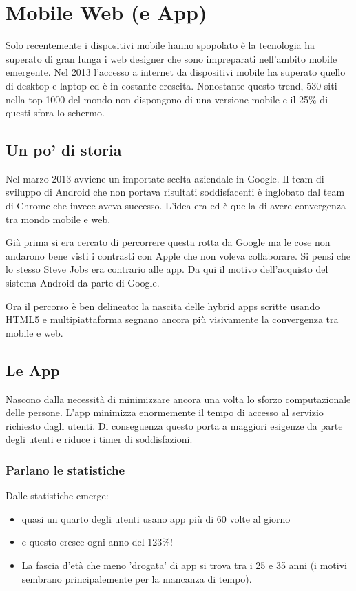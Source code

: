 
\section{Mobile Web (e App)}
	Solo recentemente i dispositivi mobile hanno spopolato è la tecnologia ha superato di gran lunga i web designer che sono impreparati nell'ambito mobile emergente. Nel 2013 l'accesso a internet da dispositivi mobile ha superato quello di desktop e laptop ed è in costante crescita. Nonostante questo trend, 530 siti nella top 1000 del mondo non dispongono di una versione mobile e il 25\% di questi sfora lo schermo.

	\subsection{Un po' di storia}
		Nel marzo 2013 avviene un importate scelta aziendale in Google. Il team di sviluppo di Android che non portava risultati soddisfacenti è inglobato dal team di Chrome che invece aveva successo. L'idea era ed è quella di avere convergenza tra mondo mobile e web. 
		
		Già prima si era cercato di percorrere questa rotta da Google ma le cose non andarono bene visti i contrasti con Apple che non voleva collaborare. Si pensi che lo stesso Steve Jobs era contrario alle app. Da qui il motivo dell'acquisto del sistema Android da parte di Google.
		
		Ora il percorso è ben delineato: la nascita delle hybrid apps scritte usando HTML5 e multipiattaforma segnano ancora più visivamente la convergenza tra mobile e web.
	
	\subsection{Le App}
		Nascono dalla necessità di minimizzare ancora una volta lo sforzo computazionale delle persone. L'app minimizza enormemente il tempo di accesso al servizio richiesto dagli utenti. Di conseguenza questo porta a maggiori esigenze da parte degli utenti e riduce i timer di soddisfazioni.
		
		\subsubsection{Parlano le statistiche}
			Dalle statistiche emerge:
			\begin{itemize}
				\item quasi un quarto degli utenti usano app più di 60 volte al giorno 
				\item e questo cresce ogni anno del 123\%!
				\item La fascia d'età che meno 'drogata' di app si trova tra i 25 e 35 anni (i motivi sembrano principalemente per la mancanza di tempo).
			\end{itemize}

